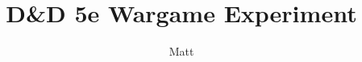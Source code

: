 \documentclass[twocolumn]{article}
\begin{document}
\title{D\&D 5e Wargame Experiment}
\author{Matt}
\maketitle














\appendix

\end{document}
